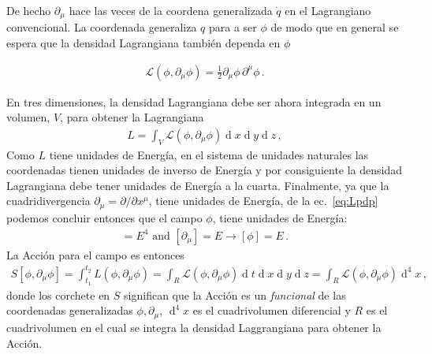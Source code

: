 \begin{frame}
De hecho $\partial_{\mu}$ hace las veces de la coordena generalizada $\dot{q}$ en el Lagrangiano convencional. La coordenada generaliza $q$ para a ser $\phi$ de modo que en general se espera que la densidad Lagrangiana también dependa en $\phi$


\begin{align}
  \label{eq:Lpdp}
  \mathcal{L}(\phi,\partial_{\mu} \phi)=  \frac{1}{2}{\partial_\mu\phi}\,{\partial^\mu\phi}\,.
\end{align}

En tres dimensiones, la densidad Lagrangiana debe ser ahora integrada en un volumen, $V$, para obtener la Lagrangiana
\begin{align}
  L=\int_V \mathcal{L}\left( \phi,\partial_{\mu}\phi \right) \operatorname{d}x\operatorname{d}y\operatorname{d}z\,,
\end{align}
Como $L$ tiene unidades de Energía, en el sistema de unidades naturales las coordenadas tienen unidades de inverso de Energía y por consiguiente la densidad Lagrangiana debe tener unidades de Energía a la cuarta. Finalmente, ya que la cuadridivergencia $\partial_{\mu}=\partial/\partial x^{\mu}$, tiene unidades de Energía, de la ec.~\eqref{eq:Lpdp} podemos concluir entonces que el campo $\phi$,  tiene unidades de Energía:
\begin{align}
 [\mathcal{L}]=E^4 \text{ and } [\partial_{\mu}]=E \to [\phi]=E\,.
\end{align}
La Acción para el campo es entonces
\begin{align}
  S[\phi,\partial_{\mu}\phi]=\int_{t_1}^{t_2} L\left( \phi,\partial_{\mu}\phi \right)=\int_{R} \mathcal{L}\left( \phi,\partial_{\mu}\phi \right) \operatorname{d}t\operatorname{d}x\operatorname{d}y\operatorname{d}z=\int_{R} \mathcal{L}\left( \phi,\partial_{\mu}\phi \right) \operatorname{d}^{4}x\,,
\end{align}
donde los corchete en $S$ significan que la Acción es un \emph{funcional} de las coordenadas generalizadas $\phi,\partial_{\mu}$, $\operatorname{d}^4 x$ es el cuadrivolumen diferencial y $R$ es el cuadrivolumen en el cual se integra la densidad Laggrangiana para obtener la Acción.

\end{frame}

